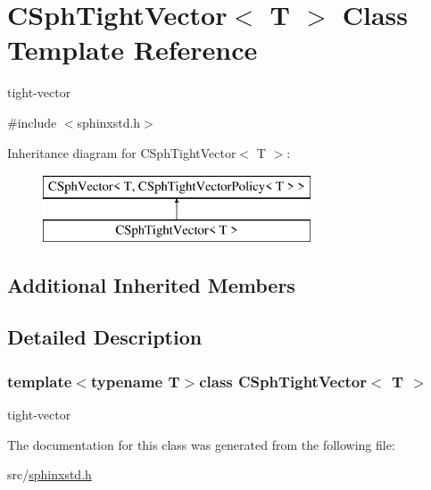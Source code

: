 \hypertarget{classCSphTightVector}{\section{C\-Sph\-Tight\-Vector$<$ T $>$ Class Template Reference}
\label{classCSphTightVector}
}


tight-\/vector  




{\ttfamily \#include $<$sphinxstd.\-h$>$}

Inheritance diagram for C\-Sph\-Tight\-Vector$<$ T $>$\-:\begin{figure}[H]
\begin{center}
\leavevmode
\includegraphics[height=2.000000cm]{classCSphTightVector}
\end{center}
\end{figure}
\subsection*{Additional Inherited Members}


\subsection{Detailed Description}
\subsubsection*{template$<$typename T$>$class C\-Sph\-Tight\-Vector$<$ T $>$}

tight-\/vector 

The documentation for this class was generated from the following file\-:\begin{DoxyCompactItemize}
\item 
src/\hyperlink{sphinxstd_8h}{sphinxstd.\-h}\end{DoxyCompactItemize}
